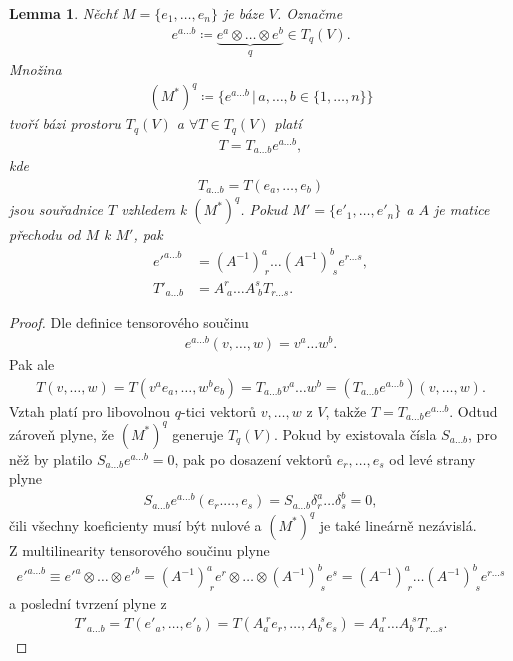 \documentclass[a4paper,11pt]{report}
\theoremstyle{theorem}
\newtheorem{lemma}[theorem]{Lemma}
\theoremstyle{remark}
\theoremstyle{definition}
\begin{document}
			\begin{lemma}
				Něchť $M = \{e_1, \dots, e_n\}$ je báze $V$. Označme
				\begin{align*}
					e^{a \dots b} \coloneqq \underbrace{e^a \otimes \dots \otimes e^b}_{q} \in T_q(V).
				\end{align*}
				Množina
				\begin{align*}
					(M^*)^q \coloneqq \{ e^{a \dots b} \, | \, a, \dots, b \in \{1, \dots, n\} \}
				\end{align*}
				tvoří bázi prostoru $T_q(V)$ a $\forall T \in T_q(V)$ platí
				\begin{align*}
					T = T_{a \dots b} e^{a \dots b},
				\end{align*}
				kde
				\begin{align*}
					T_{a \dots b} = T(e_a, \dots, e_b)
				\end{align*}
				jsou souřadnice $T$ vzhledem k $(M^*)^q$. Pokud $M' = \{e'_1, \dots, e'_n\}$ a $A$ je matice přechodu od $M$ k $M'$, pak
				\begin{align*}
					e'^{a \dots b} &= (A^{-1})^a_{\; r} \dots (A^{-1})^b_{\; s} e^{r \dots s},
				\\
					T'_{a \dots b} &= A^r_{\; a} \dots A^s_{\; b} T_{r \dots s}.
				\end{align*}
			\end{lemma}
			\begin{proof}
				Dle definice tensorového součinu
				\begin{align*}
					e^{a \dots b}(v, \dots, w) = v^a \dots w^b.
				\end{align*}
				Pak ale
				\begin{align*}
					T(v, \dots, w) = T(v^a e_a, \dots, w^b e_b) = T_{a \dots b} v^a \dots w^b = (T_{a \dots b} e^{a \dots b})(v, \dots, w).
				\end{align*}
				Vztah platí pro libovolnou $q$-tici vektorů $v, \dots, w$ z $V$, takže $T = T_{a \dots b} e^{a \dots b}$. Odtud zároveň plyne, že $(M^*)^q$ generuje $T_q(V)$. Pokud by existovala čísla $S_{a \dots b}$, pro něž by platilo $S_{a \dots b} e^{a \dots b} = 0$, pak po dosazení vektorů $e_r, \dots, e_s$ od levé strany plyne
				\begin{align*}
					S_{a \dots b} e^{a \dots b}(e_r. \dots, e_s) = S_{a \dots b} \delta^a_r \dots \delta^b_s = 0,
				\end{align*}
				čili všechny koeficienty musí být nulové a $(M^*)^q$ je také lineárně nezávislá.\\
				Z multilinearity tensorového součinu plyne
				\begin{align*}
					e'^{a \dots b} \equiv e'^a \otimes \dots \otimes e'^b = (A^{-1})^a_{\; r} e^r \otimes \dots \otimes (A^{-1})^b_{\; s} e^s = (A^{-1})^a_{\; r} \dots (A^{-1})^b_{\; s} e^{r \dots s}
				\end{align*}
				a poslední tvrzení plyne z
				\begin{align*}
					T'_{a \dots b} = T(e'_a, \dots, e'_b) = T(A_a^{\; r} e_r, \dots, A_b^{\; s} e_s) = A_a^{\; r} \dots A_b^{\; s} T_{r \dots s}.
				\end{align*}
			\end{proof}
			
\end{document}
